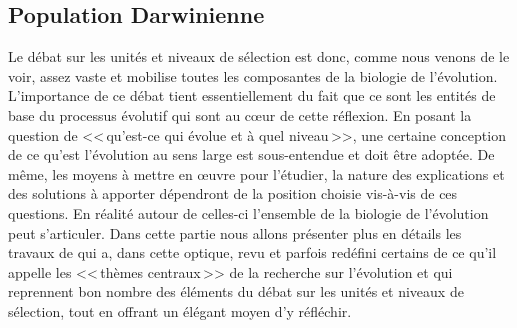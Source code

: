 \subsection{Population Darwinienne}\label{sec:pgs}

Le débat sur les unités et niveaux de sélection est donc, comme nous venons de le voir, assez vaste et mobilise toutes les composantes de la biologie de l'évolution. L'importance de ce débat tient essentiellement du fait que ce sont les entités de base du processus évolutif qui sont au c{\oe}ur de cette réflexion. En posant la question de <<\,qu'est-ce qui évolue et à quel niveau\,>>, une certaine conception de ce qu'est l'évolution au sens large est sous-entendue et doit être adoptée. De même, les moyens à mettre en {\oe}uvre pour l'étudier, la nature des explications et des solutions à apporter dépendront de la position choisie vis-à-vis de ces questions. En réalité autour de celles-ci l'ensemble de la biologie de l'évolution peut s'articuler. Dans cette partie nous allons présenter plus en détails les travaux de \cite{godfrey2009darwinian} qui a, dans cette optique, revu et parfois redéfini certains de ce qu'il appelle les <<\,thèmes centraux\,>> \citep[p.~4]{godfrey2009darwinian} de la recherche sur l'évolution et qui reprennent bon nombre des éléments du débat sur les unités et niveaux de sélection, tout en offrant un élégant moyen d'y réfléchir.

